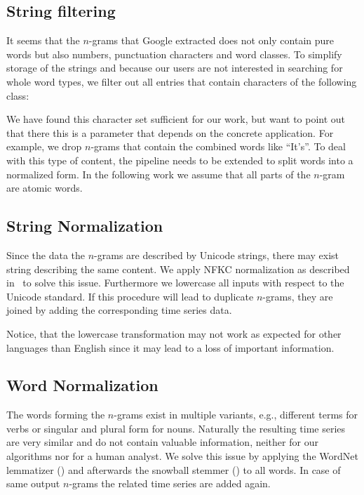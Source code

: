 \subsection{String filtering}
\label{ssec:baseline:data:filter}
It seems that the $n$-grams that Google extracted does not only contain pure words but also numbers, punctuation characters and word classes. To simplify storage of the strings and because our users are not interested in searching for whole word types, we filter out all entries that contain characters of the following class:

\code{\[\_.\slash{},:;!?\textbackslash'"\#()<>=+*\{\}0-9\]}

We have found this character set sufficient for our work, but want to point out that there this is a parameter that depends on the concrete application. For example, we drop $n$-grams that contain the combined words like \enquote{It's}. To deal with this type of content, the pipeline needs to be extended to split words into a normalized form. In the following work we assume that all parts of the $n$-gram are atomic words.

\subsection{String Normalization}
\label{ssec:baseline:data:snorm}
Since the data the $n$-grams are described by Unicode strings, there may exist string describing the same content. We apply NFKC normalization as described in~\cite{unicode8annex15} to solve this issue. Furthermore we lowercase all inputs with respect to the Unicode standard. If this procedure will lead to duplicate $n$-grams, they are joined by adding the corresponding time series data.

Notice, that the lowercase transformation may not work as expected for other languages than English since it may lead to a loss of important information.


\subsection{Word Normalization}
\label{ssec:baseline:data:wnorm}
The words forming the $n$-grams exist in multiple variants, e.g., different terms for verbs or singular and plural form for nouns. Naturally the resulting time series are very similar and do not contain valuable information, neither for our algorithms nor for a human analyst. We solve this issue by applying the WordNet lemmatizer (\cite{wordnet}) and afterwards the snowball stemmer (\cite{porter2}) to all words. In case of same output $n$-grams the related time series are added again.

